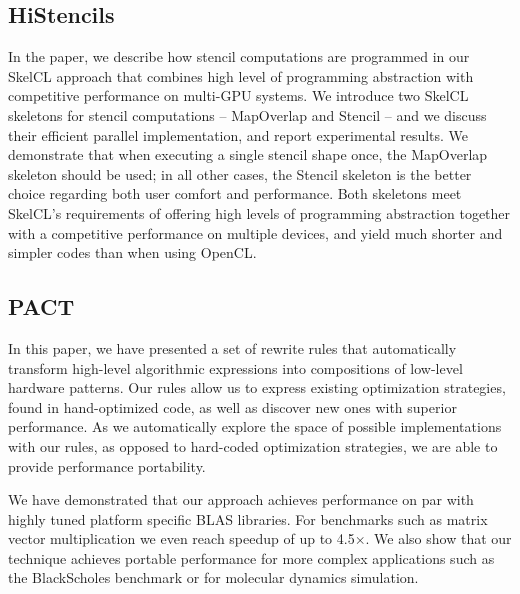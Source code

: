 \subsection{HiStencils}
In the paper, we describe how stencil computations are programmed in our SkelCL approach that combines high level of programming abstraction with competitive performance on multi-GPU systems.
We introduce two SkelCL skeletons for stencil computations -- MapOverlap and Stencil -- and we discuss their efficient parallel implementation, and report experimental results.
We demonstrate that when executing a single stencil shape once, the MapOverlap skeleton should be used;
in all other cases, the Stencil skeleton is the better choice regarding both user comfort and performance.
Both skeletons meet SkelCL's requirements of offering high levels of programming abstraction together with a competitive performance on multiple devices, and yield much shorter and simpler codes than when using OpenCL.

\subsection{PACT}
In this paper, we have presented a set of rewrite rules that automatically transform high-level algorithmic expressions into compositions of low-level hardware patterns. 
Our rules allow us to express existing optimization strategies, found in hand-optimized code, as well as discover new ones with superior performance.
As we automatically explore the space of possible implementations with our rules, as opposed to hard-coded optimization strategies, we are able to provide performance portability.

We have demonstrated that our approach achieves performance on par with highly tuned platform specific BLAS libraries.
For benchmarks such as matrix vector multiplication we even reach speedup of up to 4.5$\times$.
We also show that our technique achieves portable performance for more complex applications such as the BlackScholes benchmark or for molecular dynamics simulation.

